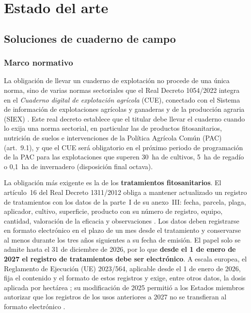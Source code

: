 \chapter{Estado del arte}\label{cap:EstadoArte}

\section{Soluciones de cuaderno de campo}\label{sec:SolucionesCuaderno}

\subsection{Marco normativo}\label{subsec:MarcoNormativo}

La obligación de llevar un cuaderno de explotación no procede de una única norma, sino de varias normas sectoriales que el Real Decreto 1054/2022 integra en el \emph{Cuaderno digital de explotación agrícola} (CUE), conectado con el Sistema de información de explotaciones agrícolas y ganaderas y de la producción agraria (SIEX) \citep{rd1054-2022}. Este real decreto establece que el titular debe llevar el cuaderno cuando lo exija una norma sectorial, en particular las de productos fitosanitarios, nutrición de suelos e intervenciones de la Política Agrícola Común (PAC) (art.~9.1), y que el CUE será obligatorio en el próximo periodo de programación de la PAC para las explotaciones que superen 30~ha de cultivos, 5~ha de regadío o 0,1~ha de invernadero (disposición final octava).

La obligación más exigente es la de los \textbf{tratamientos fitosanitarios}. El artículo~16 del Real Decreto 1311/2012 obliga a mantener actualizado un registro de tratamientos con los datos de la parte~I de su anexo~III: fecha, parcela, plaga, aplicador, cultivo, superficie, producto con su número de registro, equipo, cantidad, valoración de la eficacia y observaciones \citep{rd1311-2012}. Los datos deben registrarse en formato electrónico en el plazo de un mes desde el tratamiento y conservarse al menos durante los tres años siguientes a su fecha de emisión. El papel solo se admite hasta el 31 de diciembre de 2026, por lo que \textbf{desde el 1 de enero de 2027 el registro de tratamientos debe ser electrónico}. A escala europea, el Reglamento de Ejecución (UE) 2023/564, aplicable desde el 1 de enero de 2026, fija el contenido y el formato de estos registros y exige, entre otros datos, la dosis aplicada por hectárea \citep{reg2023-564}; su modificación de 2025 permitió a los Estados miembros autorizar que los registros de los usos anteriores a 2027 no se transfieran al formato electrónico \citep{reg2025-2203}.

